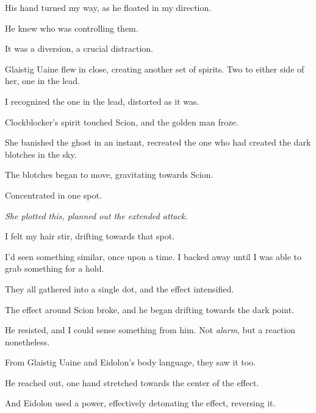 His hand turned my way, as he floated in my direction.



He knew who was controlling them.



It was a diversion, a crucial distraction.



Glaistig Uaine flew in close, creating another set of spirits.  Two to either side of her, one in the lead.



I recognized the one in the lead, distorted as it was.



Clockblocker's spirit touched Scion, and the golden man froze.



She banished the ghost in an instant, recreated the one who had created the dark blotches in the sky.



The blotches began to move, gravitating towards Scion.



Concentrated in one spot.



\emph{She plotted this, planned out the extended attack}.



I felt my hair stir, drifting towards that spot.



I'd seen something similar, once upon a time.  I backed away until I was able to grab something for a hold.



They all gathered into a single dot, and the effect intensified.



The effect around Scion broke, and he began drifting towards the dark point.



He resisted, and I could sense something from him.  Not \emph{alarm}, but a reaction nonetheless.



From Glaistig Uaine and Eidolon's body language, they saw it too.



He reached out, one hand stretched towards the center of the effect.



And Eidolon used a power, effectively detonating the effect, reversing it.



